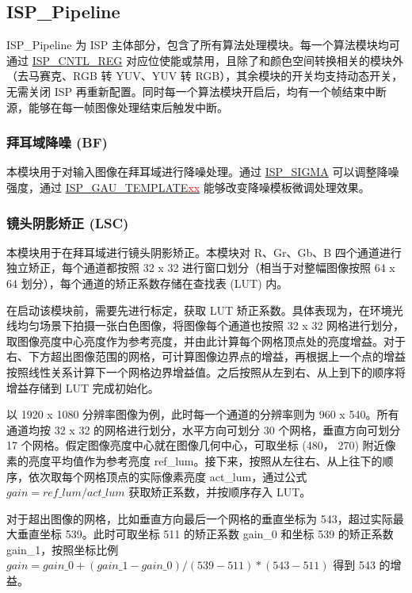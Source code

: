 \documentclass[main\_\_CN.tex]{subfiles}
\begin{document}
\subsection{ISP\_Pipeline}
\label{sec:isp_pipeline}
ISP\_Pipeline 为 ISP 主体部分，包含了所有算法处理模块。每一个算法模块均可通过 \hyperref[regdesc:ISPCNTLREG]{ISP\_CNTL\_REG} 对应位使能或禁用，且除了和颜色空间转换相关的模块外（去马赛克、RGB 转 YUV、YUV 转 RGB），其余模块的开关均支持动态开关，无需关闭 ISP 再重新配置。同时每一个算法模块开启后，均有一个帧结束中断源，能够在每一帧图像处理结束后触发中断。


\subsubsection{拜耳域降噪 (BF)}
\label{sec:isp_bf}
本模块用于对输入图像在拜耳域进行降噪处理。通过 \hyperref[fielddesc:ISPSIGMA]{ISP\_SIGMA} 可以调整降噪强度，通过 \hyperref[fielddesc:ISPGAUTEMPLATE00]{ISP\_GAU\_TEMPLATE\textcolor{red}{xx}} 能够改变降噪模板微调处理效果。

\subsubsection{镜头阴影矫正 (LSC)}
\label{sec:isp_lsc}
本模块用于在拜耳域进行镜头阴影矫正。本模块对 R、Gr、Gb、B 四个通道进行独立矫正，每个通道都按照 32 x 32 进行窗口划分（相当于对整幅图像按照 64 x 64 划分），每个通道的矫正系数存储在查找表 (LUT) 内。

在启动该模块前，需要先进行标定，获取 LUT 矫正系数。具体表现为，在环境光线均匀场景下拍摄一张白色图像，将图像每个通道也按照 32 x 32 网格进行划分，取图像亮度中心亮度作为参考亮度，并由此计算每个网格顶点处的亮度增益。对于右、下方超出图像范围的网格，可计算图像边界点的增益，再根据上一个点的增益按照线性关系计算下一个网格边界增益值。之后按照从左到右、从上到下的顺序将增益存储到 LUT 完成初始化。

以 1920 x 1080 分辨率图像为例，此时每一个通道的分辨率则为 960 x 540。所有通道均按 32 x 32 的网格进行划分，水平方向可划分 30 个网格，垂直方向可划分 17 个网格。假定图像亮度中心就在图像几何中心，可取坐标 (480， 270) 附近像素的亮度平均值作为参考亮度 ref\_lum。接下来，按照从左往右、从上往下的顺序，依次取每个网格顶点的实际像素亮度 act\_lum，通过公式 $gain = ref\_lum / act\_lum$ 获取矫正系数，并按顺序存入 LUT。

对于超出图像的网格，比如垂直方向最后一个网格的垂直坐标为 543，超过实际最大垂直坐标 539。此时可取坐标 511 的矫正系数 gain\_0 和坐标 539 的矫正系数 gain\_1，按照坐标比例 $gain = gain\_0 + (gain\_1 - gain\_0) / (539 - 511) * (543 - 511)$ 得到 543 的增益。
\end{document}
